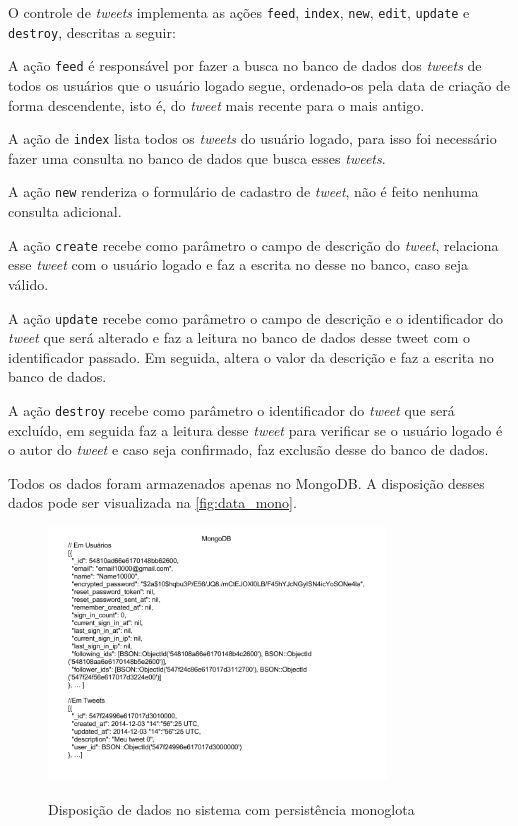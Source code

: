 O controle de \textit{tweets} implementa as ações \verb|feed|, \verb|index|, \verb|new|, \verb|edit|, \verb|update| e \verb|destroy|, descritas a seguir:

A ação \verb|feed| é responsável por fazer a busca no banco de dados dos \textit{tweets} de todos os usuários que o usuário logado segue, ordenado-os pela data de criação de forma descendente, isto é, do \textit{tweet} mais recente para o mais antigo.

A ação de \verb|index| lista todos os \textit{tweets} do usuário logado, para isso foi necessário fazer uma consulta no banco de dados que busca esses \textit{tweets}.

A ação \verb|new| renderiza o formulário de cadastro de \textit{tweet}, não é feito nenhuma consulta adicional.

A ação \verb|create| recebe como parâmetro o campo de descrição do \textit{tweet}, relaciona esse \textit{tweet} com o usuário logado e faz a escrita no desse no banco, caso seja válido.

A ação \verb|update| recebe como parâmetro o campo de descrição e o identificador do \textit{tweet} que será alterado e faz a leitura no banco de dados desse tweet com o identificador passado. Em seguida, altera o valor da descrição e faz a escrita no banco de dados.

A ação \verb|destroy| recebe como parâmetro o identificador do \textit{tweet} que será excluído, em seguida faz a leitura desse \textit{tweet} para verificar se o usuário logado é o autor do \textit{tweet} e caso seja confirmado, faz exclusão desse do banco de dados.

Todos os dados foram armazenados apenas no MongoDB. A disposição desses dados pode ser visualizada na \autoref{fig:data_mono}.
\begin{figure}[H]
    \centering
    \caption{Disposição de dados no sistema com persistência monoglota}
    \includegraphics[width=0.8\textwidth]{./04-figuras/data_mono.png}
    \label{fig:data_mono}
\end{figure}


